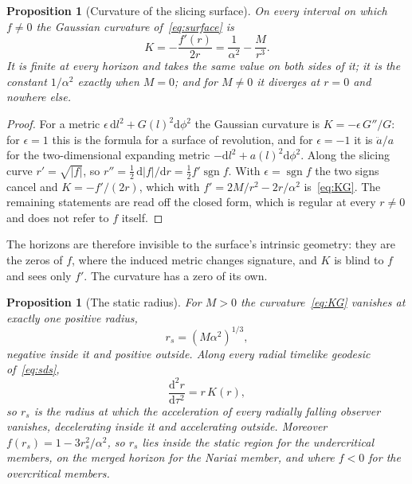 \documentclass[11pt]{article}
\theoremstyle{plain}
\newtheorem{proposition}[theorem]{Proposition}
\theoremstyle{definition}
\theoremstyle{remark}
\newcommand{\dd}{\mathrm{d}}
\begin{document}
\begin{proposition}[Curvature of the slicing surface]\label{prop:curvature}
On every interval on which $f\neq0$ the Gaussian curvature of~\eqref{eq:surface} is
\begin{equation}\label{eq:KG}
K=-\frac{f'(r)}{2r}=\frac{1}{\alpha^{2}}-\frac{M}{r^{3}} .
\end{equation}
It is finite at every horizon and takes the same value on both sides of it; it is the constant $1/\alpha^{2}$
exactly when $M=0$; and for $M\neq0$ it diverges at $r=0$ and nowhere else.
\end{proposition}

\begin{proof}
For a metric $\epsilon\,\dd l^{2}+G(l)^{2}\dd\phi^{2}$ the Gaussian curvature is $K=-\epsilon\,G''/G$: for
$\epsilon=1$ this is the formula for a surface of revolution, and for $\epsilon=-1$ it is $\ddot a/a$ for the
two-dimensional expanding metric $-\dd l^{2}+a(l)^{2}\dd\phi^{2}$. Along the slicing curve $r'=\sqrt{|f|}$, so
$r''=\tfrac12\,\dd|f|/\dd r=\tfrac12 f'\operatorname{sgn}f$. With $\epsilon=\operatorname{sgn}f$ the two signs cancel and
$K=-f'/(2r)$, which with $f'=2M/r^{2}-2r/\alpha^{2}$ is~\eqref{eq:KG}. The remaining statements are read off
the closed form, which is regular at every $r\neq0$ and does not refer to $f$ itself.
\end{proof}

The horizons are therefore invisible to the surface's intrinsic geometry: they are the zeros of $f$, where the
induced metric changes signature, and $K$ is blind to $f$ and sees only $f'$. The curvature has a zero of its own.

\begin{proposition}[The static radius]\label{prop:static}
For $M>0$ the curvature~\eqref{eq:KG} vanishes at exactly one positive radius,
\begin{equation}\label{eq:rs}
r_{s}=(M\alpha^{2})^{1/3},
\end{equation}
negative inside it and positive outside. Along every radial timelike geodesic of~\eqref{eq:sds},
\begin{equation}\label{eq:accel}
\frac{\dd^{2}r}{\dd\tau^{2}}=r\,K(r),
\end{equation}
so $r_{s}$ is the radius at which the acceleration of every radially falling observer vanishes, decelerating
inside it and accelerating outside. Moreover $f(r_{s})=1-3r_{s}^{2}/\alpha^{2}$, so $r_{s}$ lies inside the static
region for the undercritical members, on the merged horizon for the Nariai member, and where $f<0$ for the
overcritical members.
\end{proposition}
\end{document}
